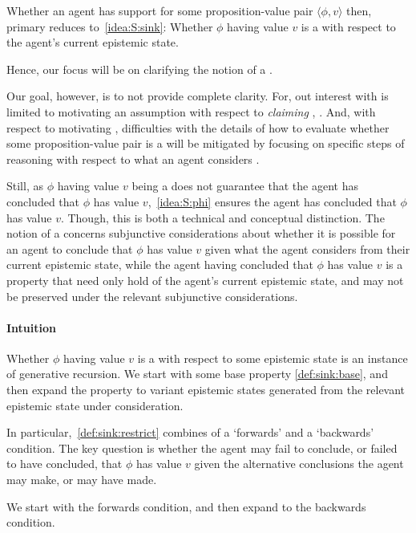 \begin{note}
  Whether an agent has support for some proposition-value pair \(\langle \phi,v \rangle\) then, primary reduces to~\ref{idea:S:sink}:
  Whether \(\phi\) having value \(v\) is a \sink{} with respect to the agent's current epistemic state.

  Hence, our focus will be on clarifying the notion of a \sink{}.

  Our goal, however, is to not provide complete clarity.
  For, out interest with \support{} is limited to motivating an assumption with respect to \emph{claiming} \support{}, \ideaCS{}.
  And, with respect to motivating \ideaCS{}, difficulties with the details of how to evaluate whether some proposition-value pair is a \sink{} will be mitigated by focusing on specific steps of reasoning with respect to what an agent considers \epVAd{}.

  Still, as \(\phi\) having value \(v\) being a \sink{} does not guarantee that the agent has concluded that \(\phi\) has value \(v\),~\ref{idea:S:phi} ensures the agent has concluded that \(\phi\) has value \(v\).
  Though, this is both a technical and conceptual distinction.
  The notion of a \sink{} concerns subjunctive considerations about whether it is possible for an agent to conclude that \(\phi\) has value \(v\) given what the agent considers \epPAd{} from their current epistemic state, while the agent having concluded that \(\phi\) has value \(v\) is a property that need only hold of the agent's current epistemic state, and may not be preserved under the relevant subjunctive considerations.
\end{note}

\paragraph{Intuition}
\label{sec:ideaS:intuition}

\begin{note}[Structure]
  Whether \(\phi\) having value \(v\) is a \sink{} with respect to some epistemic state is an instance of generative recursion.
  We start with some base property \ref{def:sink:base}, and then expand the property to variant epistemic states generated from the relevant epistemic state under consideration.

  In particular,~\ref{def:sink:restrict} combines of a `forwards' and a `backwards' condition.
  The key question is whether the agent may fail to conclude, or failed to have concluded, that \(\phi\) has value \(v\) given the alternative conclusions the agent may make, or may have made.

  We start with the forwards condition, and then expand to the backwards condition.
\end{note}

